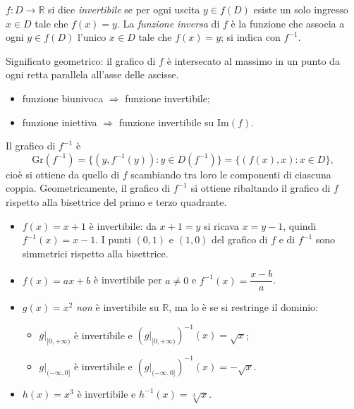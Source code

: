 \documentclass[11pt,a4paper]{article}
\begin{document}
\begin{definizione}
$f : D \to \mathbb{R}$ si dice \emph{invertibile} se per ogni uscita $y \in f(D)$ esiste un solo ingresso $x \in D$ tale che $f(x) = y$. La \emph{funzione inversa} di $f$ è la funzione che associa a ogni $y \in f(D)$ l'unico $x \in D$ tale che $f(x) = y$; si indica con $f^{-1}$.
\end{definizione}

Significato geometrico: il grafico di $f$ è intersecato al massimo in un punto da ogni retta parallela all'asse delle ascisse.

\begin{itemize}
    \item funzione biunivoca $\Rightarrow$ funzione invertibile;
    \item funzione iniettiva $\Rightarrow$ funzione invertibile su $\mathrm{Im}(f)$.
\end{itemize}

Il grafico di $f^{-1}$ è
\[
\mathrm{Gr}(f^{-1}) = \{(y, f^{-1}(y)) : y \in D(f^{-1})\} = \{(f(x), x) : x \in D\},
\]
cioè si ottiene da quello di $f$ scambiando tra loro le componenti di ciascuna coppia. Geometricamente, il grafico di $f^{-1}$ si ottiene ribaltando il grafico di $f$ rispetto alla bisettrice del primo e terzo quadrante.

\begin{esempio}
\leavevmode
\begin{itemize}
    \item $f(x) = x + 1$ è invertibile: da $x + 1 = y$ si ricava $x = y - 1$, quindi $f^{-1}(x) = x - 1$. I punti $(0,1)$ e $(1,0)$ del grafico di $f$ e di $f^{-1}$ sono simmetrici rispetto alla bisettrice.
    \item $f(x) = ax + b$ è invertibile per $a \neq 0$ e $f^{-1}(x) = \dfrac{x - b}{a}$.
    \item $g(x) = x^2$ \emph{non} è invertibile su $\mathbb{R}$, ma lo è se si restringe il dominio:
    \begin{itemize}
        \item $g|_{[0,+\infty)}$ è invertibile e $(g|_{[0,+\infty)})^{-1}(x) = \sqrt{x}$;
        \item $g|_{(-\infty,0]}$ è invertibile e $(g|_{(-\infty,0]})^{-1}(x) = -\sqrt{x}$.
    \end{itemize}
    \item $h(x) = x^3$ è invertibile e $h^{-1}(x) = \sqrt[3]{x}$.
\end{itemize}
\end{esempio}
\end{document}
